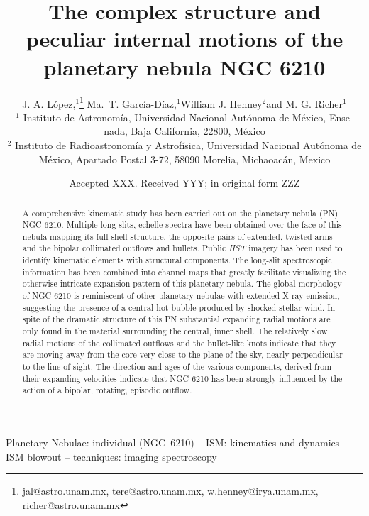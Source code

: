 \documentclass[useAMS, usenatbib]{mnras}
\title{The complex structure and peculiar internal motions of the planetary nebula NGC 6210}
\author[López et al.]{
  J. A. López,\(^1\)\thanks{
    jal@astro.unam.mx,
    tere@astro.unam.mx,
    w.henney@irya.unam.mx,
    richer@astro.unam.mx
  }
  Ma.\ T. García-Díaz,\(^1\)\footnotemark[1]
  William J. Henney\(^2\)\footnotemark[1]
  and M. G. Richer\(^1\)\footnotemark[1]
  \\
  \(^1\)\foreignlanguage{spanish}{
    Instituto de Astronomía,
    Universidad Nacional Autónoma de México,
    Ensenada, Baja California, 22800, México}
  \\
  \(^2\)\foreignlanguage{spanish}{
    Instituto de Radioastronomía y
    Astrofísica, Universidad Nacional Autónoma de México, Apartado
    Postal 3-72, 58090 Morelia, Michaoacán, Mexico}
}
\date{Accepted XXX. Received YYY; in original form ZZZ}
\begin{document}
 
\label{firstpage}
\pagerange{\pageref{firstpage}--\pageref{lastpage}}
\maketitle

\begin{abstract}
  A comprehensive kinematic study has been carried out on the planetary nebula (PN) NGC 6210. Multiple long-slits, echelle spectra have been obtained over the face of this nebula mapping its full shell structure, the opposite pairs of extended, twisted arms and the bipolar collimated outflows and bullets. Public {\it HST} imagery has been used to identify kinematic elements with structural components. The long-slit spectroscopic information has been combined into channel maps that greatly facilitate visualizing the otherwise intricate expansion pattern of this  planetary nebula. The global morphology of NGC 6210 is  reminiscent of other planetary nebulae with extended X-ray emission, suggesting the presence of a central hot bubble produced by shocked stellar wind. In spite of the dramatic structure of this PN substantial expanding radial motions are only found in the material surrounding the central, inner shell. The relatively slow radial motions of the collimated outflows and the bullet-like knots indicate that they are  moving away from the core very close to the plane of the sky, nearly perpendicular to the line of sight. The direction and ages of the various components, derived from their expanding velocities indicate that NGC 6210 has been strongly influenced by the  action of a bipolar, rotating, episodic outflow.
\end{abstract}


\begin{keywords}
  Planetary Nebulae: individual (NGC~6210)
  -- ISM: kinematics and dynamics -- ISM blowout
  -- techniques: imaging spectroscopy
\end{keywords}

\maketitle
\end{document}
